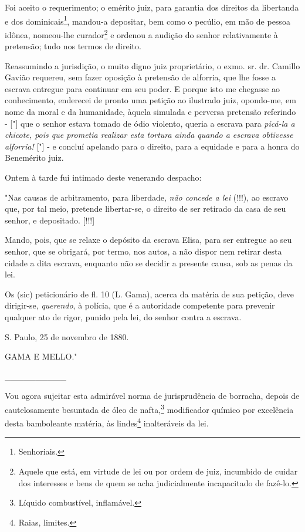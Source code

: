 Foi aceito o requerimento; o emérito juiz, para garantia dos direitos da
libertanda e dos dominicais\footnote{Senhoriais.}, mandou-a depositar,
bem como o pecúlio, em mão de pessoa idônea, nomeou-lhe
curador\footnote{Aquele que está, em virtude de lei ou por ordem de
  juiz, incumbido de cuidar dos interesses e bens de quem se acha
  judicialmente incapacitado de fazê-lo.} e ordenou a audição do senhor
relativamente à pretensão; tudo nos termos de direito.

Reassumindo a jurisdição, o muito digno juiz proprietário, o exmo. sr.
dr. Camillo Gavião requereu, sem fazer oposição à pretensão de alforria,
que lhe fosse a escrava entregue para continuar em seu poder. E porque
isto me chegasse ao conhecimento, enderecei de pronto uma petição ao
ilustrado juiz, opondo-me, em nome da moral e da humanidade, àquela
simulada e perversa pretensão referindo - {[}"{]} que o senhor estava
tomado de ódio violento, queria a escrava para \emph{picá-la a chicote,
pois que prometia realizar esta tortura ainda quando a escrava obtivesse
alforria!} {[}"{]} - e concluí apelando para o direito, para a equidade
e para a honra do Benemérito juiz.

Ontem à tarde fui intimado deste venerando despacho:

"Nas causas de arbitramento, para liberdade, \emph{não concede a lei}
(!!!), ao escravo que, por tal meio, pretende libertar-se, o direito de
ser retirado da casa de seu senhor, e depositado. {[}!!!{]}

Mando, pois, que se relaxe o depósito da escrava Elisa, para ser
entregue ao seu senhor, que se obrigará, por termo, nos autos, a não
dispor nem retirar desta cidade a dita escrava, enquanto não se decidir
a presente causa, sob as penas da lei.

Os (sic) peticionário de fl. 10 (L. Gama), acerca da matéria de sua
petição, deve dirigir-se, \emph{querendo}, à polícia, que é a autoridade
competente para prevenir qualquer ato de rigor, punido pela lei, do
senhor contra a escrava.

S. Paulo, 25 de novembro de 1880.

GAMA E MELLO."

\_\_\_\_\_\_\_\_\_\_

Vou agora sujeitar esta admirável norma de jurisprudência de borracha,
depois de cautelosamente besuntada de óleo de nafta,\footnote{Líquido
  combustível, inflamável.} modificador químico por excelência desta
bamboleante matéria, às lindes\footnote{Raias, limites.} inalteráveis
da lei.

